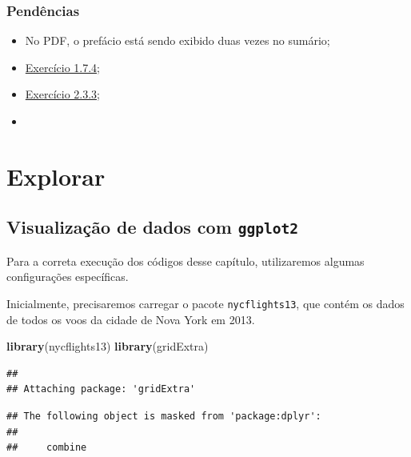 \documentclass[
]{latex/krantz}
\newenvironment{Shaded}{\begin{snugshade}}{\end{snugshade}}
\newcommand{\FunctionTok}[1]{\textcolor[rgb]{0.13,0.29,0.53}{\textbf{#1}}}
\newcommand{\NormalTok}[1]{#1}
\providecommand{\tightlist}{%
  \setlength{\itemsep}{0pt}\setlength{\parskip}{0pt}}
\theoremstyle{definition}
\theoremstyle{definition}
\theoremstyle{definition}
\theoremstyle{definition}
\theoremstyle{remark}
\begin{document}
\hypertarget{penduxeancias}{%
\section*{Pendências}\label{penduxeancias}}

\begin{itemize}
\tightlist
\item
  No PDF, o prefácio está sendo exibido duas vezes no sumário;
\item
  \protect\hyperlink{exr1-7-4}{Exercício 1.7.4};
\item
  \protect\hyperlink{exr2-3-3}{Exercício 2.3.3};
\item
\end{itemize}

\mainmatter

\hypertarget{part-explorar}{%
\part{Explorar}\label{part-explorar}}

\hypertarget{visualizauxe7uxe3o-de-dados-com-ggplot2}{%
\chapter{\texorpdfstring{Visualização de dados com \texttt{ggplot2}}{Visualização de dados com ggplot2}}\label{visualizauxe7uxe3o-de-dados-com-ggplot2}}

Para a correta execução dos códigos desse capítulo, utilizaremos algumas configurações específicas.

Inicialmente, precisaremos carregar o pacote \texttt{nycflights13}, que contém os dados de todos os voos da cidade de Nova York em 2013.

\begin{Shaded}
\begin{Highlighting}[]
\FunctionTok{library}\NormalTok{(nycflights13)}
\FunctionTok{library}\NormalTok{(gridExtra)}
\end{Highlighting}
\end{Shaded}

\begin{verbatim}
## 
## Attaching package: 'gridExtra'
\end{verbatim}

\begin{verbatim}
## The following object is masked from 'package:dplyr':
## 
##     combine
\end{verbatim}
\end{document}
